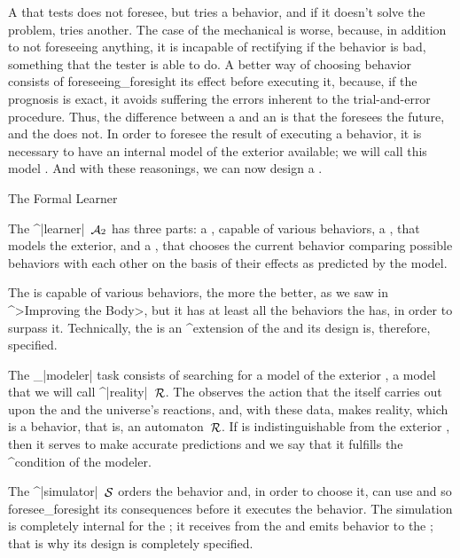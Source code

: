 A {\governor} that tests does not foresee, but tries a behavior, and if
it doesn't solve the problem, tries another. The case of the mechanical
{\governor} is worse, because, in addition to not foreseeing anything,
it is incapable of rectifying if the behavior is bad, something that the
tester is able to do. A better way of choosing behavior consists of
foreseeing_{foresight} its effect before executing it, because, if the
prognosis is exact, it avoids suffering the errors inherent to the
trial-and-error procedure. Thus, the difference between a {\learner} and
an {\adaptor} is that the {\learner} foresees the future, and the
{\adaptor} does not. In order to foresee the result of executing a
behavior, it is necessary to have an internal model of the exterior
available; we will call this model {\reality}. And with these
reasonings, we can now design a {\learner}.


\Section The Formal Learner

The ^|learner|~$\aut A_2$ has three parts: a {\body}, capable of various
behaviors, a {\modeler}, that models the exterior, and a {\simulator},
that chooses the current behavior comparing possible behaviors with each
other on the basis of their effects as predicted by the model.

\beginpoints
\point The {\learners} {\body} is capable of various behaviors,
the more the better, as we saw in ^>Improving the Body>, but it has at
least all the behaviors the {\adaptor} has, in order to surpass it.
Technically, the {\learners} {\body} is an ^{extension} of the
{\adaptors} {\body} and its design is, therefore, specified.

\point The {\modelers}_|modeler| task consists of searching for
a model of the exterior {\universe}, a model that we will call
^|reality|~$\aut R$. The {\modeler} observes the action that the
{\learner} itself carries out upon the {\universe} and the universe's
reactions, and, with these data, makes reality, which is a behavior,
that is, an automaton~$\aut R$. If {\reality} is indistinguishable from
the exterior {\universe}, then it serves to make accurate predictions
and we say that it fulfills the ^{condition of the modeler}.

\point The ^|simulator|~$\aut S$ orders the behavior and,
in order to choose it, can use {\reality} and so foresee_{foresight} its
consequences before it executes the behavior. The simulation is
completely internal for the {\learner}; it receives {\reality} from the
{\modeler} and emits behavior to the {\body}; that is why its design is
completely specified.

